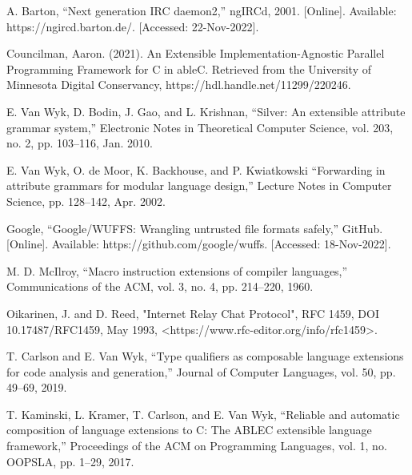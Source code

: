 \documentclass[12pt]{article}
\begin{document}




\newpage

\hypersetup{hidelinks}
\tableofcontents

\newpage


\newpage

\newpage

\newpage

\newpage

\newpage

\newpage

\newpage
\begin{thebibliography}{99}
		A. Barton, “Next generation IRC daemon2,” ngIRCd, 2001. [Online]. Available: https://ngircd.barton.de/.
		[Accessed: 22-Nov-2022]. 


		Councilman, Aaron. (2021). An Extensible Implementation-Agnostic Parallel Programming Framework for C in ableC. Retrieved from the University of
		Minnesota Digital Conservancy, https://hdl.handle.net/11299/220246.

        E. Van Wyk, D. Bodin, J. Gao, and L. Krishnan, “Silver: An extensible 
        attribute grammar system,” Electronic Notes in Theoretical Computer 
        Science, vol. 203, no. 2, pp. 103–116, Jan. 2010. 

		E. Van Wyk, O. de Moor, K. Backhouse, and P. Kwiatkowski “Forwarding in 
        attribute grammars for modular language design,” Lecture Notes in 
        Computer Science, pp. 128–142, Apr. 2002.
    
        Google, “Google/WUFFS: Wrangling untrusted file formats safely,” GitHub. 
        [Online]. Available: https://github.com/google/wuffs. [Accessed: 
        18-Nov-2022]. 
	
		M. D. McIlroy, “Macro instruction extensions of compiler languages,” 
        Communications of the ACM, vol. 3, no. 4, pp. 214–220, 1960. 
	
	    Oikarinen, J. and D. Reed, "Internet Relay Chat Protocol", RFC 1459, DOI 
        10.17487/RFC1459, May 1993, <https://www.rfc-editor.org/info/rfc1459>.
	
		T. Carlson and E. Van Wyk, “Type qualifiers as composable language 
		extensions for code analysis and generation,” Journal of Computer 
		Languages, vol. 50, pp. 49–69, 2019. 
	
	    T. Kaminski, L. Kramer, T. Carlson, and E. Van Wyk, “Reliable and 
        automatic composition of language extensions to C: The ABLEC extensible 
        language framework,” Proceedings of the ACM on Programming Languages, 
        vol. 1, no. OOPSLA, pp. 1–29, 2017. 
\end{thebibliography}
\end{document}
